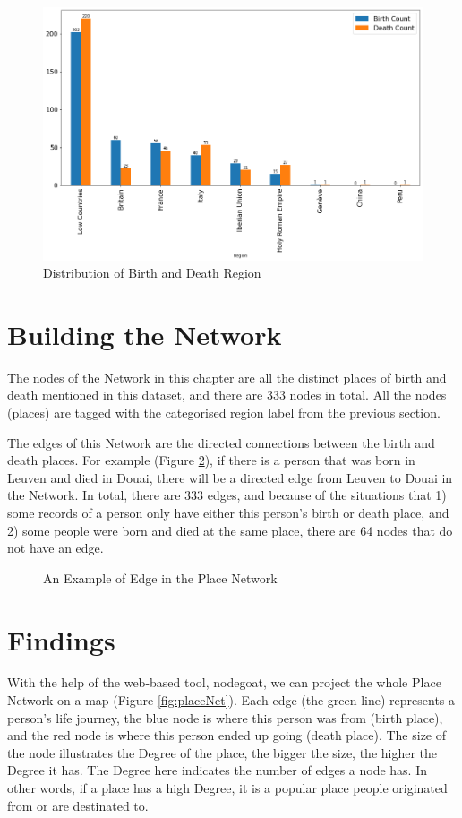 \documentclass[12pt,a4paper,oneside]{book}
\begin{document}
\begin{sloppypar}
\begin{figure}[H]
\centering
\includegraphics[scale=0.4]{graph/Count of Birth and Death Region.png}
\caption{Distribution of Birth and Death Region}
\label{fig:countBDRegion}
\end{figure}

\pagebreak
\section{Building the Network}
The nodes of the Network in this chapter are all the distinct places of birth and death mentioned in this dataset, and there are 333 nodes in total. All the nodes (places) are tagged with the categorised region label from the previous section.

The edges of this Network are the directed connections between the birth and death places. For example (Figure \ref{fig:examplePlaceNet}), if there is a person that was born in Leuven and died in Douai, there will be a directed edge from Leuven to Douai in the Network. In total, there are 333 edges, and because of the situations that 1) some records of a person only have either this person’s birth or death place, and 2) some people were born and died at the same place, there are 64 nodes that do not have an edge.

\begin{figure}[H]
\centering

\caption{An Example of Edge in the Place Network}
\label{fig:examplePlaceNet}
\end{figure}

\section{Findings}
With the help of the web-based tool, nodegoat, we can project the whole Place Network on a map (Figure \ref{fig:placeNet}). Each edge (the green line) represents a person’s life journey, the blue node is where this person was from (birth place), and the red node is where this person ended up going (death place). The size of the node illustrates the Degree of the place, the bigger the size, the higher the Degree it has. The Degree here indicates the number of edges a node has. In other words, if a place has a high Degree, it is a popular place people originated from or are destinated to.


\end{sloppypar}
\end{document}
